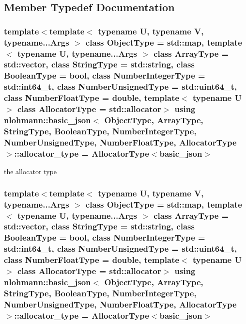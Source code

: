 \subsection{Member Typedef Documentation}
\hypertarget{classnlohmann_1_1basic__json_aa44ce84b9ac506b905b8fb56c9a0989d}{
\subsubsection[{allocator\-\_\-type}]{\setlength{\rightskip}{0pt plus 5cm}template$<$template$<$ typename U, typename V, typename...\-Args $>$ class Object\-Type = std\-::map, template$<$ typename U, typename...\-Args $>$ class Array\-Type = std\-::vector, class String\-Type  = std\-::string, class Boolean\-Type  = bool, class Number\-Integer\-Type  = std\-::int64\-\_\-t, class Number\-Unsigned\-Type  = std\-::uint64\-\_\-t, class Number\-Float\-Type  = double, template$<$ typename U $>$ class Allocator\-Type = std\-::allocator$>$ using {\bf nlohmann\-::basic\-\_\-json}$<$ Object\-Type, Array\-Type, String\-Type, Boolean\-Type, Number\-Integer\-Type, Number\-Unsigned\-Type, Number\-Float\-Type, Allocator\-Type $>$\-::{\bf allocator\-\_\-type} =  Allocator\-Type$<${\bf basic\-\_\-json}$>$}}\label{classnlohmann_1_1basic__json_aa44ce84b9ac506b905b8fb56c9a0989d}


the allocator type 

\hypertarget{classnlohmann_1_1basic__json_aa44ce84b9ac506b905b8fb56c9a0989d}{
\subsubsection[{allocator\-\_\-type}]{\setlength{\rightskip}{0pt plus 5cm}template$<$template$<$ typename U, typename V, typename...\-Args $>$ class Object\-Type = std\-::map, template$<$ typename U, typename...\-Args $>$ class Array\-Type = std\-::vector, class String\-Type  = std\-::string, class Boolean\-Type  = bool, class Number\-Integer\-Type  = std\-::int64\-\_\-t, class Number\-Unsigned\-Type  = std\-::uint64\-\_\-t, class Number\-Float\-Type  = double, template$<$ typename U $>$ class Allocator\-Type = std\-::allocator$>$ using {\bf nlohmann\-::basic\-\_\-json}$<$ Object\-Type, Array\-Type, String\-Type, Boolean\-Type, Number\-Integer\-Type, Number\-Unsigned\-Type, Number\-Float\-Type, Allocator\-Type $>$\-::{\bf allocator\-\_\-type} =  Allocator\-Type$<${\bf basic\-\_\-json}$>$}}\label{classnlohmann_1_1basic__json_aa44ce84b9ac506b905b8fb56c9a0989d}


